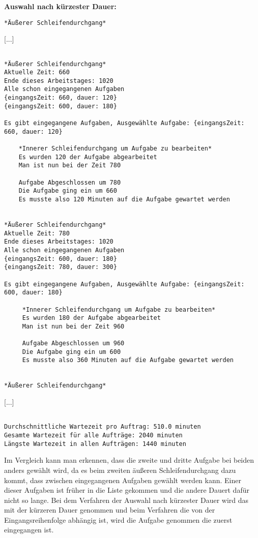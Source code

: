 \documentclass[a4paper,10pt,ngerman]{scrartcl}
\begin{document}
\textbf{ Auswahl nach kürzester Dauer:}
\begin{lstlisting}[numbers=none]
*Äußerer Schleifendurchgang*
\end{lstlisting}
[...]
\begin{lstlisting}[numbers=none]

*Äußerer Schleifendurchgang*
Aktuelle Zeit: 660
Ende dieses Arbeitstages: 1020
Alle schon eingegangenen Aufgaben
{eingangsZeit: 660, dauer: 120}
{eingangsZeit: 600, dauer: 180}

Es gibt eingegangene Aufgaben, Ausgewählte Aufgabe: {eingangsZeit: 660, dauer: 120}

    *Innerer Schleifendurchgang um Aufgabe zu bearbeiten*
    Es wurden 120 der Aufgabe abgearbeitet
    Man ist nun bei der Zeit 780

    Aufgabe Abgeschlossen um 780
    Die Aufgabe ging ein um 660
    Es musste also 120 Minuten auf die Aufgabe gewartet werden


*Äußerer Schleifendurchgang*
Aktuelle Zeit: 780
Ende dieses Arbeitstages: 1020
Alle schon eingegangenen Aufgaben
{eingangsZeit: 600, dauer: 180}
{eingangsZeit: 780, dauer: 300}

Es gibt eingegangene Aufgaben, Ausgewählte Aufgabe: {eingangsZeit: 600, dauer: 180}

     *Innerer Schleifendurchgang um Aufgabe zu bearbeiten*
     Es wurden 180 der Aufgabe abgearbeitet
     Man ist nun bei der Zeit 960

     Aufgabe Abgeschlossen um 960
     Die Aufgabe ging ein um 600
     Es musste also 360 Minuten auf die Aufgabe gewartet werden


*Äußerer Schleifendurchgang*
\end{lstlisting}
[...]
\begin{lstlisting}[numbers=none]

Durchschnittliche Wartezeit pro Auftrag: 510.0 minuten
Gesamte Wartezeit für alle Aufträge: 2040 minuten
Längste Wartezeit in allen Aufträgen: 1440 minuten
\end{lstlisting}

Im Vergleich kann man erkennen, dass die zweite und dritte Aufgabe bei beiden anders gewählt wird,
da es beim zweiten äußeren Schleifendurchgang dazu kommt, dass zwischen eingegangenen Aufgaben gewählt werden kann.
Einer dieser Aufgaben ist früher in die Liste gekommen und die andere Dauert dafür nicht so lange.
Bei dem Verfahren der Auswahl nach kürzester Dauer wird das mit der kürzeren Dauer genommen und
beim Verfahren die von der Eingangsreihenfolge abhängig ist,
wird die Aufgabe genommen die zuerst eingegangen ist.
\end{document}
